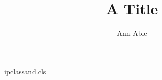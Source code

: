 \begin{filecontents*}[overwrite]{ipclassand.cls}
\def\and{\unskip{} \&\ \ignorespaces}
\newcommand\address[1]{\par{\small #1}\par}
\end{filecontents*}
\documentclass{ipclassand}

\title{A Title}
\author{Ann Able}
\address{Univ A, Town \and Univ B, City}
\maketitle
Body.

